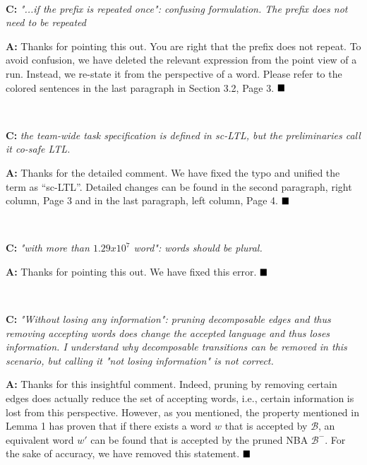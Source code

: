 \documentclass[10pt]{article}
\begin{document}
\hspace*{\fill} \


\textbf{C:}
\emph{"...if the prefix is repeated once": confusing formulation. The prefix does not need to be
	repeated
}

\textbf{A:} Thanks for pointing this out. You are right that the prefix does not repeat.
To avoid confusion, we have deleted the relevant expression from the point view of a run.
Instead, we re-state it from the perspective of a word. Please refer to the colored sentences in the last paragraph in Section 3.2, Page 3.
$\hfill\blacksquare$

\hspace*{\fill} \


\textbf{C:}
\emph{the team-wide task specification is defined in sc-LTL, but the preliminaries call it co-safe LTL.
}

\textbf{A:} Thanks for the detailed comment. We have fixed the typo and unified the term as ``sc-LTL''.
Detailed changes can be found in the second paragraph, right column, Page 3
and in the last paragraph, left column, Page 4.
$\hfill\blacksquare$

\hspace*{\fill} \

\textbf{C:}
\emph{ "with more than $1.29 x 10^7$ word": words should be plural.}

\textbf{A:} Thanks for pointing this out. We have fixed this error.
$\hfill\blacksquare$

\hspace*{\fill} \


\textbf{C:}
\emph{ "Without losing any information": pruning decomposable edges and thus removing accepting
	words does change the accepted language and thus loses information. I understand why
	decomposable transitions can be removed in this scenario, but calling it "not losing
	information" is not correct.
}

\textbf{A:} Thanks for this insightful comment.
Indeed, pruning by removing certain edges does actually reduce the set of accepting words,
i.e., certain information is lost from this perspective.
However, as you mentioned, the property mentioned in Lemma 1 has proven that
if there exists a word $w$ that is accepted by $\mathcal{B}$,
an equivalent word $w'$ can be found that is accepted
by the pruned NBA $\mathcal{B}^-$.
For the sake of accuracy, we have
removed this statement.
$\hfill\blacksquare$
\end{document}
